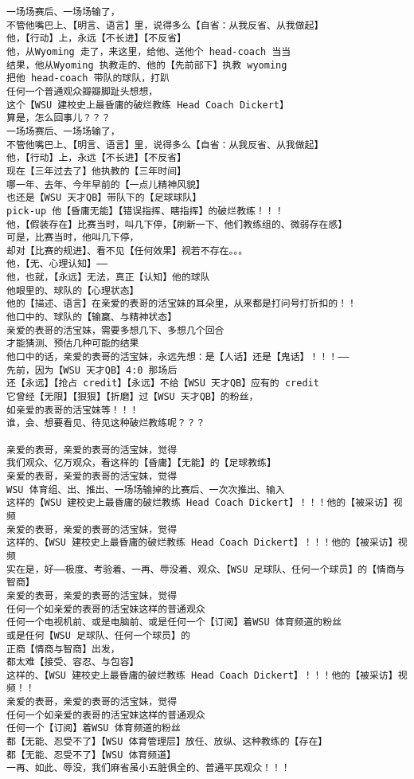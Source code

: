 \documentclass[9pt, b5paper]{article}
\begin{document}
\begin{verbatim}
一场场赛后、一场场输了，
不管他嘴巴上、【明言、语言】里，说得多么【自省：从我反省、从我做起】
他，【行动】上，永远【不长进】【不反省】
他，从Wyoming 走了，来这里，给他、送他个 head-coach 当当
结果，他从Wyoming 执教走的、他的【先前部下】执教 wyoming
把他 head-coach 带队的球队，打趴
任何一个普通观众瓣瓣脚趾头想想，
这个【WSU 建校史上最昏庸的破烂教练 Head Coach Dickert】
算是，怎么回事儿？？？
一场场赛后、一场场输了，
不管他嘴巴上、【明言、语言】里，说得多么【自省：从我反省、从我做起】
他，【行动】上，永远【不长进】【不反省】
现在【三年过去了】他执教的【三年时间】
哪一年、去年、今年早前的【一点儿精神风貌】
也还是【WSU 天才QB】带队下的【足球球队】
pick-up 他【昏庸无能】【错误指挥、瞎指挥】的破烂教练！！！
他，【假装存在】比赛当时，叫几下停，【刷新一下、他们教练组的、微弱存在感】
可是，比赛当时，他叫几下停，
却对【比赛的规进】、看不见【任何效果】视若不存在。。。
他，【无、心理认知】——
他，也就，【永远】无法，真正【认知】他的球队
他眼里的、球队的【心理状态】
他的【描述、语言】在亲爱的表哥的活宝妹的耳朵里，从来都是打问号打折扣的！！
他口中的、球队的【输赢、与精神状态】
亲爱的表哥的活宝妹，需要多想几下、多想几个回合
才能猜测、预估几种可能的结果
他口中的话，亲爱的表哥的活宝妹，永远先想：是【人话】还是【鬼话】！！！——
先前，因为【WSU 天才QB】4:0 那场后
还【永远】【抢占 credit】【永远】不给【WSU 天才QB】应有的 credit
它曾经【无限】【狠狠】【折磨】过【WSU 天才QB】的粉丝，
如亲爱的表哥的活宝妹等！！！
谁，会、想要看见、待见这种破烂教练呢？？？

亲爱的表哥，亲爱的表哥的活宝妹，觉得
我们观众、亿万观众，看这样的【昏庸】【无能】的【足球教练】
亲爱的表哥，亲爱的表哥的活宝妹，觉得
WSU 体育组、出、推出、一场场输掉的比赛后、一次次推出、输入
这样的【WSU 建校史上最昏庸的破烂教练 Head Coach Dickert】！！！他的【被采访】视频
亲爱的表哥，亲爱的表哥的活宝妹，觉得
这样的、【WSU 建校史上最昏庸的破烂教练 Head Coach Dickert】！！！他的【被采访】视频
实在是，好——极度、考验着、一再、辱没着、观众、【WSU 足球队、任何一个球员】的【情商与智商】
亲爱的表哥，亲爱的表哥的活宝妹，觉得
任何一个如亲爱的表哥的活宝妹这样的普通观众
任何一个电视机前、或是电脑前、或是任何一个【订阅】着WSU 体育频道的粉丝
或是任何【WSU 足球队、任何一个球员】的
正商【情商与智商】出发，
都太难【接受、容忍、与包容】
这样的、【WSU 建校史上最昏庸的破烂教练 Head Coach Dickert】！！！他的【被采访】视频！！
亲爱的表哥，亲爱的表哥的活宝妹，觉得
任何一个如亲爱的表哥的活宝妹这样的普通观众
任何一个【订阅】着WSU 体育频道的粉丝
都【无能、忍受不了】【WSU 体育管理层】放任、放纵、这种教练的【存在】
都【无能、忍受不了】【WSU 体育频道】
一再、如此、辱没，我们麻省虽小五脏俱全的、普通平民观众！！！


\end{verbatim}
\end{document}
